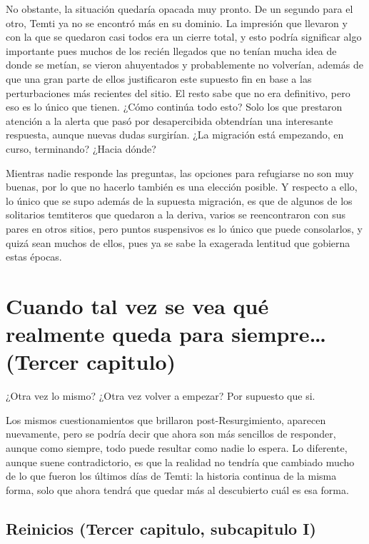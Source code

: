 \documentclass[
  spanish,
]{book}
\begin{document}
No obstante, la situación quedaría opacada muy pronto. De un segundo para el otro, Temti ya no se encontró más en su dominio. La impresión que llevaron y con la que se quedaron casi todos era un cierre total, y esto podría significar algo importante pues muchos de los recién llegados que no tenían mucha idea de donde se metían, se vieron ahuyentados y probablemente no volverían, además de que una gran parte de ellos justificaron este supuesto fin en base a las perturbaciones más recientes del sitio. El resto sabe que no era definitivo, pero eso es lo único que tienen. ¿Cómo continúa todo esto?
Solo los que prestaron atención a la alerta que pasó por desapercibida obtendrían una interesante respuesta, aunque nuevas dudas surgirían. ¿La migración está empezando, en curso, terminando? ¿Hacia dónde?

Mientras nadie responde las preguntas, las opciones para refugiarse no son muy buenas, por lo que no hacerlo también es una elección posible. Y respecto a ello, lo único que se supo además de la supuesta migración, es que de algunos de los solitarios temtiteros que quedaron a la deriva, varios se reencontraron con sus pares en otros sitios, pero puntos suspensivos es lo único que puede consolarlos, y quizá sean muchos de ellos, pues ya se sabe la exagerada lentitud que gobierna estas épocas.

\hypertarget{cuando-tal-vez-se-vea-quuxe9-realmente-queda-para-siempre-tercer-capitulo}{%
\chapter{Cuando tal vez se vea qué realmente queda para siempre\ldots{} (Tercer capitulo)}\label{cuando-tal-vez-se-vea-quuxe9-realmente-queda-para-siempre-tercer-capitulo}}

¿Otra vez lo mismo? ¿Otra vez volver a empezar? Por supuesto que si.

Los mismos cuestionamientos que brillaron post-Resurgimiento, aparecen nuevamente, pero se podría decir que ahora son más sencillos de responder, aunque como siempre, todo puede resultar como nadie lo espera. Lo diferente, aunque suene contradictorio, es que la realidad no tendría que cambiado mucho de lo que fueron los últimos días de Temti: la historia continua de la misma forma, solo que ahora tendrá que quedar más al descubierto cuál es esa forma.

\hypertarget{reinicios-tercer-capitulo-subcapitulo-i}{%
\section{Reinicios (Tercer capitulo, subcapitulo I)}\label{reinicios-tercer-capitulo-subcapitulo-i}}
\end{document}
